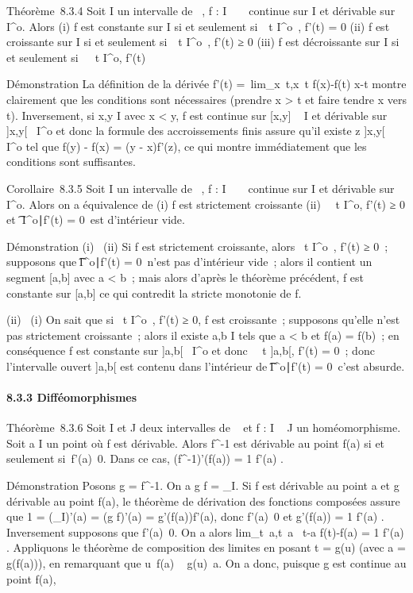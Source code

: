 Théorème~8.3.4 Soit I un intervalle de ~, f : I \rightarrow~ ~ continue sur I et
dérivable sur I^o. Alors (i) f est constante sur I si et
seulement si~\forall~t \in I^o~, f'(t) = 0
(ii) f est croissante sur I si et seulement
si~\forall~t \in I^o~, f'(t) ≥ 0 (iii) f est
décroissante sur I si et seulement si~\forall~~t \in
I^o, f'(t) 

Démonstration La définition de la dérivée f'(t)
=\
lim_x\rightarrow~t,x\neq~t f(x)-f(t)
\over x-t montre clairement que les conditions sont
nécessaires (prendre x > t et faire tendre x vers t).
Inversement, si x,y \in I avec x < y, f est continue sur
[x,y] \subset~ I et dérivable sur ]x,y[\subset~ I^o et donc la
formule des accroissements finis assure qu'il existe z \in]x,y[\subset~
I^o tel que f(y) - f(x) = (y - x)f'(z), ce qui montre
immédiatement que les conditions sont suffisantes.

Corollaire~8.3.5 Soit I un intervalle de ~, f : I \rightarrow~ ~ continue sur I et
dérivable sur I^o. Alors on a équivalence de (i) f est
strictement croissante (ii) \forall~~t \in
I^o, f'(t) ≥ 0 et \t \in
I^o∣f'(t) = 0\
est d'intérieur vide.

Démonstration (i) \rigtharrow~(ii) Si f est strictement croissante, alors
\forall~t \in I^o~, f'(t) ≥ 0~; supposons que
\t \in I^o∣f'(t) =
0\ n'est pas d'intérieur vide~; alors il contient un
segment [a,b] avec a < b~; mais alors d'après le théorème
précédent, f est constante sur [a,b] ce qui contredit la stricte
monotonie de f.

(ii) \rigtharrow~(i) On sait que si \forall~t \in I^o~,
f'(t) ≥ 0, f est croissante~; supposons qu'elle n'est pas strictement
croissante~; alors il existe a,b \in I tels que a < b et f(a) =
f(b)~; en conséquence f est constante sur ]a,b[\subset~ I^o et
donc \forall~~t \in]a,b[, f'(t) = 0~; donc
l'intervalle ouvert ]a,b[ est contenu dans l'intérieur de
\t \in I^o∣f'(t) =
0\, c'est absurde.

\paragraph{8.3.3 Difféomorphismes}

Théorème~8.3.6 Soit I et J deux intervalles de ~ et f : I \rightarrow~ J un
homéomorphisme. Soit a \in I un point où f est dérivable. Alors
f^-1 est dérivable au point f(a) si et seulement
si~f'(a)\neq~0. Dans ce cas,
(f^-1)'(f(a)) = 1 \over f'(a) .

Démonstration Posons g = f^-1. On a g \cdot f =
\mathrmId_I. Si f est dérivable au point a et
g dérivable au point f(a), le théorème de dérivation des fonctions
composées assure que 1 = (\mathrmId_I)'(a) =
(g \cdot f)'(a) = g'(f(a))f'(a), donc f'(a)\neq~0 et
g'(f(a)) = 1 \over f'(a) . Inversement supposons que
f'(a)\neq~0. On a alors
lim_t\rightarrow~a,t\neq~a~
t-a \over f(t)-f(a) = 1 \over f'(a)
. Appliquons le théorème de composition des limites en posant t = g(u)
(avec a = g(f(a))), en remarquant que u\neq~f(a)
\rigtharrow~ g(u)\neq~a. On a donc, puisque g est continue
au point f(a),

